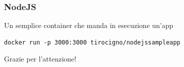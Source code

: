 \documentclass{beamer}
\begin{document}

\begin{frame}[fragile]
\frametitle{NodeJS}
\begin{block}{Un semplice container che manda in esecuzione un'app}
\begin{verbatim}
docker run -p 3000:3000 tirocigno/nodejssampleapp
\end{verbatim}
\end{block}
\end{frame}







\begin{frame}
\Huge{\centerline{Grazie per l'attenzione!}}
\end{frame}

\end{document}
